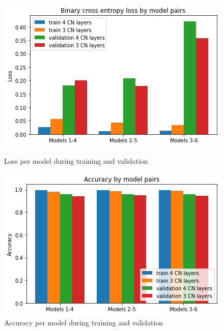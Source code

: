 \begin{figure}[!htb]
    \centering
    \begin{minipage}{0.4\textwidth}
        \includegraphics[width=\textwidth]{images/loss.png}
        \caption{Loss per model during training and validation}
        \label{Lossgraph}
    \end{minipage}
    
    \vspace{1cm} %
    
    \begin{minipage}{0.4\textwidth}
        \includegraphics[width=\textwidth]{images/ac.png}
        \caption{Accuracy per model during training and validation}
        \label{ACgraph}
    \end{minipage}
\end{figure}

